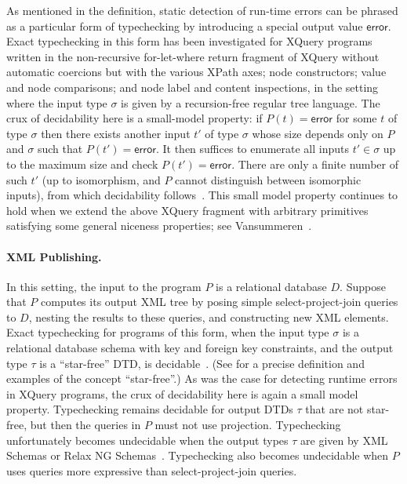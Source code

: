 \documentclass[twoside,leqno,onecolumn,pdftex]{article}
\newcommand{\error}{\textsf{error}\xspace}
\begin{document}
\begin{scientific}
As mentioned in the definition, static detection of run-time errors
can be phrased as a particular form of typechecking by introducing a
special output value $\error$. Exact typechecking in this form has
been investigated for XQuery programs written in the non-recursive
for-let-where return fragment of XQuery without automatic coercions
but with the various XPath axes; node constructors; value and node
comparisons; and node label and content inspections, in the setting
where the input type $\sigma$ is given by a recursion-free regular
tree language. The crux of decidability here is a small-model
property: if $P(t) = \error$ for some $t$ of type $\sigma$ then there
exists another input $t'$ of type $\sigma$ whose size depends only on
$P$ and $\sigma$ such that $P(t') = \error$. It then suffices to
enumerate all inputs $t' \in \sigma$ up to the maximum size and check
$P(t') = \error$.  There are only a finite number of such $t'$ (up to
isomorphism, and $P$ cannot distinguish between isomorphic inputs),
from which decidability follows~\cite{vansummeren:welldef-trees}. This
small model property continues to hold when we extend the above XQuery
fragment with arbitrary primitives satisfying some general niceness
properties; see Vansummeren~\cite{vansummeren:welldef-trees}.

\paragraph*{XML Publishing.}
\label{sec:xml-publishing}

In this setting, the input to the program $P$ is a relational database
$D$. Suppose that $P$ computes its output XML tree by posing simple
select-project-join queries to $D$, nesting the results to these
queries, and constructing new XML elements.  Exact typechecking for
programs of this form, when the input type $\sigma$ is a relational
database schema with key and foreign key constraints, and the output
type $\tau$ is a ``star-free'' DTD, is
decidable~\cite{DBLP:journals/tocl/AlonMNSV03}. (See
\cite{DBLP:journals/tocl/AlonMNSV03} for a precise definition and
examples of the concept ``star-free''.) As was the case for detecting
runtime errors in XQuery programs, the crux of decidability here is
again a small model property.  Typechecking remains decidable for
output DTDs $\tau$ that are not star-free, but then the queries in $P$
must not use projection.  Typechecking unfortunately becomes
undecidable when the output types $\tau$ are given by XML Schemas or
Relax NG Schemas~\cite{DBLP:journals/tocl/AlonMNSV03}.  Typechecking
also becomes undecidable when $P$ uses queries more expressive than
select-project-join queries.


\end{scientific}
\end{document}

